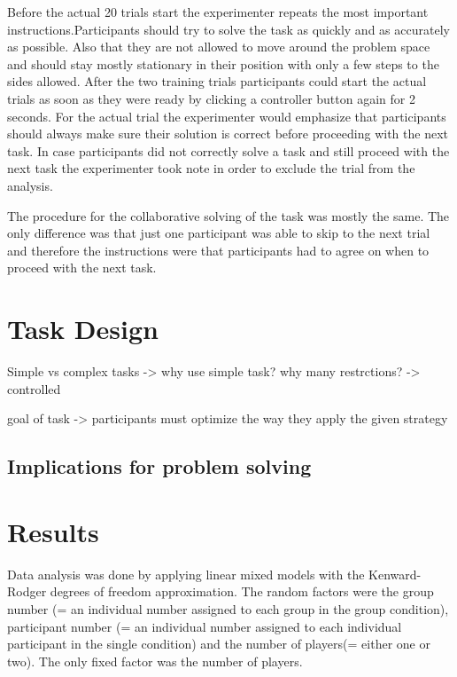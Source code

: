 \documentclass{article}
\begin{document}
Before the actual 20 trials start the experimenter repeats the most important instructions.Participants should try to solve the task as quickly and as accurately as possible. Also that they are not allowed to move around the problem space and should stay mostly stationary in their position with only a few steps to the sides allowed.
After the two training trials participants could start the actual trials as soon as they were ready by clicking a controller button again for 2 seconds. For the actual trial the experimenter would emphasize that participants should always make sure their solution is correct before proceeding with the next task. In case participants did not correctly solve a task and still proceed with the next task the experimenter took note in order to exclude the trial from the analysis.

The procedure for the collaborative solving of the task was mostly the same. The only difference was that just one participant was able to skip to the next trial and therefore the instructions were that participants had to agree on when to proceed with the next task.



\section{Task Design}
Simple vs complex tasks -> why use simple task? why many restrctions? -> controlled

goal of task -> participants must optimize the way they apply the given strategy
\subsection{Implications for problem solving}

\section{Results}
Data analysis was done by applying linear mixed models with the Kenward-Rodger degrees of freedom approximation. The random factors were the group number (= an individual number assigned to each group in the group condition), participant number (= an individual number assigned to each individual participant in the single condition) and the number of players(= either one or two). The only fixed factor was the number of players. 
\end{document}
